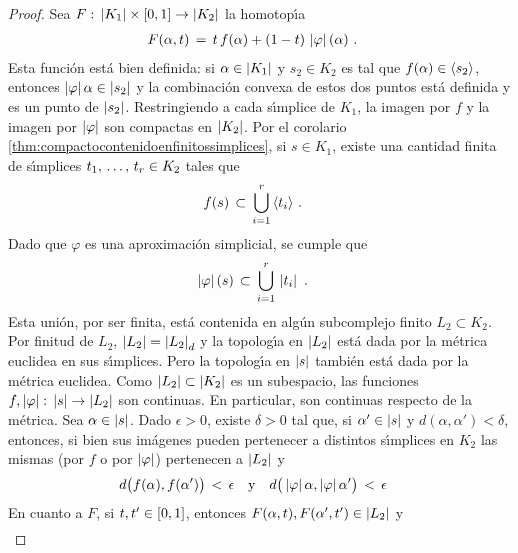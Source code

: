 \begin{proof}
	Sea $F:\,\left|K_{1}\right|\times\left[0,1\right]\rightarrow\left|K_{2}\right|$ la
	homotop\'{\i}a
	\begin{align*}
		F(\alpha,t) & \,=\,t\,f(\alpha)+(1-t)\,\left|\varphi\right|(\alpha)
		\text{ .}
	\end{align*}
	Esta funci\'{o}n est\'{a} bien definida: si $\alpha\in\left|K_{1}\right|$ y
	$s_{2}\in K_{2}$ es tal que $f(\alpha)\in\langle s_{2}\rangle$,
	entonces $\left|\varphi\right|\alpha\in\left|s_{2}\right|$ y la combinaci\'{o}n
	convexa de estos dos puntos est\'{a} definida y es un punto de
	$\left|s_{2}\right|$. Restringiendo a cada s\'{\i}mplice de $K_{1}$,
	la imagen por $f$ y la imagen por $\left|\varphi\right|$ son compactas
	en $\left|K_{2}\right|$. Por el corolario
	\ref{thm:compactocontenidoenfinitossimplices}, si $s\in K_{1}$, existe
	una cantidad finita de s\'{\i}mplices $\lista{t}{r}\in K_{2}$ tales que
	\begin{align*}
		f(s) & \,\subset\,\bigcup_{i=1}^{r}\,\langle t_{i}\rangle
		\text{ .}
	\end{align*}
	Dado que $\varphi$ es una aproximaci\'{o}n simplicial, se cumple que
	\begin{align*}
		\left|\varphi\right|(s) & \,\subset\,
			\bigcup_{i=1}^{r}\,\left|t_{i}\right|
		\text{ .}
	\end{align*}
	Esta uni\'{o}n, por ser finita, est\'{a} contenida en alg\'{u}n
	subcomplejo finito $L_{2}\subset K_{2}$. Por finitud de $L_{2}$,
	$\left|L_{2}\right|=\left|L_{2}\right|_{d}$ y la topolog\'{\i}a en $\left|L_{2}\right|$
	est\'{a} dada por la m\'{e}trica euclidea en sus s\'{\i}mplices. Pero
	la topolog\'{\i}a en $\left|s\right|$ tambi\'{e}n est\'{a} dada por la
	m\'{e}trica euclidea. Como $\left|L_{2}\right|\subset\left|K_{2}\right|$ es un
	subespacio, las funciones
	$f,\left|\varphi\right|:\,\left|s\right|\rightarrow\left|L_{2}\right|$ son continuas.
	En particular, son continuas respecto de la m\'{e}trica. Sea
	$\alpha\in\left|s\right|$. Dado $\epsilon>0$, existe $\delta>0$ tal que,
	si $\alpha'\in\left|s\right|$ y $d(\alpha,\alpha')<\delta$, entonces, si
	bien sus im\'{a}genes pueden pertenecer a distintos s\'{\i}mplices
	en $K_{2}$ las mismas (por $f$ o por $\left|\varphi\right|$) pertenecen a
	$\left|L_{2}\right|$ y
	\begin{align*}
		d\big(f(\alpha),f(\alpha')\big)\,<\,\epsilon
			& \quad\text{y}\quad
		d\big(\left|\varphi\right|\alpha,\left|\varphi\right|\alpha'\big)
			\,<\,\epsilon
	\end{align*}
	En cuanto a $F$, si $t,t'\in\left[0,1\right]$, entonces
	$F(\alpha,t),F(\alpha',t')\in\left|L_{2}\right|$ y
	\begin{align*}

\end{align*}
\end{proof}
